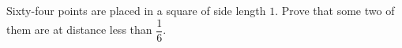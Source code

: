 Sixty-four points are placed in a square of side length $1$. Prove that some two of them are at distance less than $\dfrac{1}{6}$.
